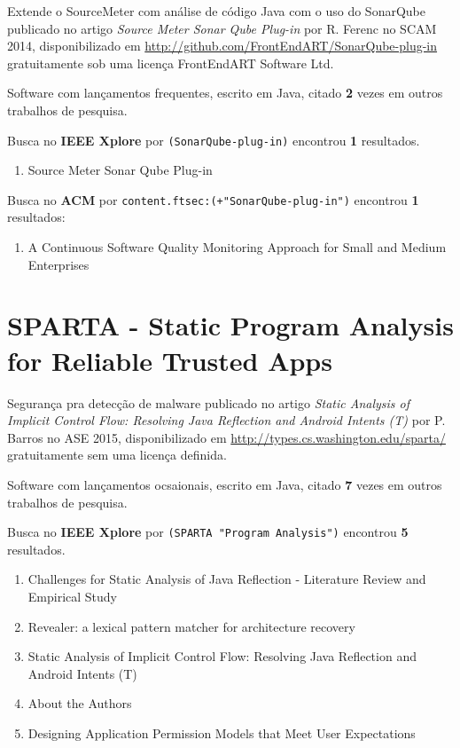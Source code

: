 Extende o SourceMeter com análise de código Java com o uso do SonarQube
publicado no artigo {\it Source Meter Sonar Qube Plug-in}
por R. Ferenc
no SCAM 2014,
disponibilizado em \url{http://github.com/FrontEndART/SonarQube-plug-in}
gratuitamente
sob uma licença FrontEndART Software Ltd.

Software com lançamentos frequentes,
escrito em Java,
citado {\bf 2} vezes em outros trabalhos de pesquisa.

Busca no {\bf IEEE Xplore} por
\texttt{(SonarQube-plug-in)}
encontrou {\bf 1}
resultados.

\begin{enumerate}
\item Source Meter Sonar Qube Plug-in
\end{enumerate}

Busca no {\bf ACM} por
\texttt{content.ftsec:(+"SonarQube-plug-in")}
encontrou {\bf 1}
resultados:

\begin{enumerate}
\item A Continuous Software Quality Monitoring Approach for Small and Medium Enterprises
\end{enumerate}

\section{SPARTA - Static Program Analysis for Reliable Trusted Apps}

Segurança pra detecção de malware
publicado no artigo {\it Static Analysis of Implicit Control Flow: Resolving Java Reflection and Android Intents (T)}
por P. Barros
no ASE 2015,
disponibilizado em \url{http://types.cs.washington.edu/sparta/}
gratuitamente
sem uma licença definida.

Software com lançamentos ocsaionais,
escrito em Java,
citado {\bf 7} vezes em outros trabalhos de pesquisa.

Busca no {\bf IEEE Xplore} por
\texttt{(SPARTA "Program Analysis")}
encontrou {\bf 5}
resultados.

\begin{enumerate}
\item Challenges for Static Analysis of Java Reflection - Literature Review and Empirical Study
\item Revealer: a lexical pattern matcher for architecture recovery
\item Static Analysis of Implicit Control Flow: Resolving Java Reflection and Android Intents (T)
\item About the Authors
\item Designing Application Permission Models that Meet User Expectations
\end{enumerate}

